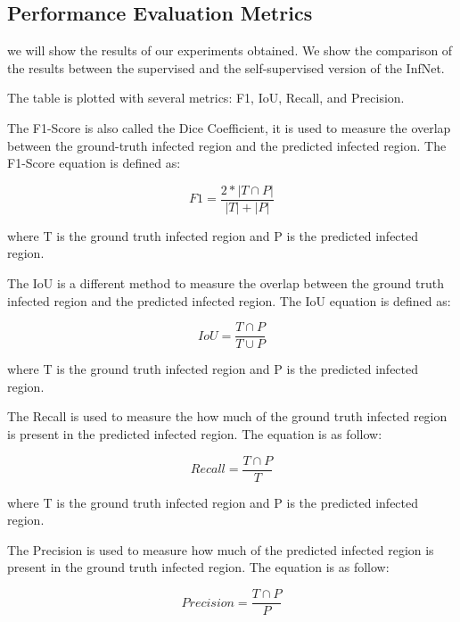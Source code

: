 \subsection{Performance Evaluation Metrics}
we will show the results of our experiments obtained. We show the comparison of the results between the supervised and the self-supervised version of the InfNet.

The table is plotted with several metrics: F1, IoU, Recall, and Precision. 

The F1-Score is also called the Dice Coefficient, it is used to measure the overlap between the ground-truth infected region and the predicted infected region. The F1-Score equation is defined as:

\begin{equation}
F1 = \frac{2 * | T \cap P |}{|T| + |P|}
\end{equation}

where T is the ground truth infected region and P is the predicted infected region.

The IoU is a different method to measure the overlap between the ground truth infected region and the predicted infected region. The IoU equation is defined as:

\begin{equation}
IoU = \frac{T \cap P}{T \cup P}
\end{equation}

where T is the ground truth infected region and P is the predicted infected region.

The Recall is used to measure the how much of the ground truth infected region is present in the predicted infected region. The equation is as follow:

\begin{equation}
Recall = \frac{T \cap P}{T}
\end{equation}

where T is the ground truth infected region and P is the predicted infected region.

The Precision is used to measure how much of the predicted infected region is present in the ground truth infected region. The equation is as follow:

\begin{equation}
Precision = \frac{T \cap P}{P}
\end{equation}

